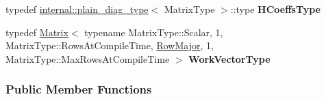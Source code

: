 \begin{DoxyCompactItemize}
typedef \hyperlink{struct_eigen_1_1internal_1_1plain__diag__type}{internal\+::plain\+\_\+diag\+\_\+type}$<$ Matrix\+Type $>$\+::type {\bfseries H\+Coeffs\+Type}
\item 
\mbox{\label{group___q_r___module_a07f618acb4fada7e8d4017d7e341f4ec}} 
typedef \hyperlink{group___core___module_class_eigen_1_1_matrix}{Matrix}$<$ typename Matrix\+Type\+::\+Scalar, 1, Matrix\+Type\+::\+Rows\+At\+Compile\+Time, \hyperlink{group__enums_ggaacded1a18ae58b0f554751f6cdf9eb13acfcde9cd8677c5f7caf6bd603666aae3}{Row\+Major}, 1, Matrix\+Type\+::\+Max\+Rows\+At\+Compile\+Time $>$ {\bfseries Work\+Vector\+Type}
\end{DoxyCompactItemize}
\subsubsection*{Public Member Functions}
